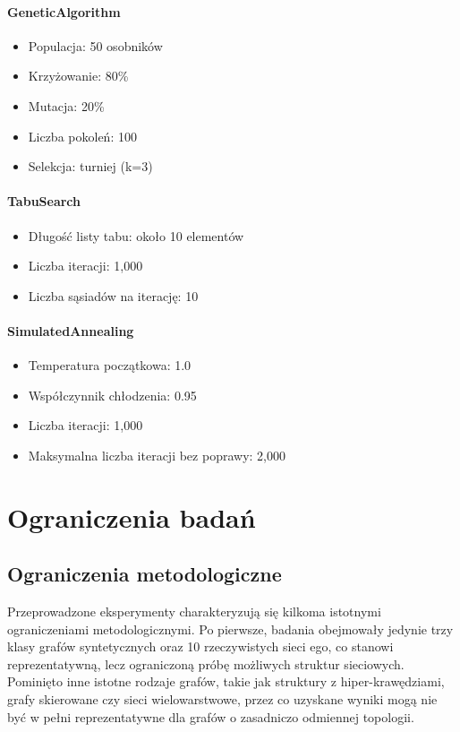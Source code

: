 \paragraph{GeneticAlgorithm}
\begin{itemize}
\item Populacja: 50 osobników
\item Krzyżowanie: 80\%
\item Mutacja: 20\%
\item Liczba pokoleń: 100
\item Selekcja: turniej (k=3)
\end{itemize}

\paragraph{TabuSearch}
\begin{itemize}
\item Długość listy tabu: około 10 elementów
\item Liczba iteracji: 1,000
\item Liczba sąsiadów na iterację: 10
\end{itemize}

\paragraph{SimulatedAnnealing}
\begin{itemize}
\item Temperatura początkowa: 1.0
\item Współczynnik chłodzenia: 0.95
\item Liczba iteracji: 1,000
\item Maksymalna liczba iteracji bez poprawy: 2,000
\end{itemize}

\section{Ograniczenia badań}

\subsection{Ograniczenia metodologiczne}

Przeprowadzone eksperymenty charakteryzują się kilkoma istotnymi ograniczeniami metodologicznymi. Po pierwsze, badania obejmowały jedynie trzy klasy grafów syntetycznych oraz 10 rzeczywistych sieci ego, co stanowi reprezentatywną, lecz ograniczoną próbę możliwych struktur sieciowych. Pominięto inne istotne rodzaje grafów, takie jak struktury z hiper-krawędziami, grafy skierowane czy sieci wielowarstwowe, przez co uzyskane wyniki mogą nie być w pełni reprezentatywne dla grafów o zasadniczo odmiennej topologii.

